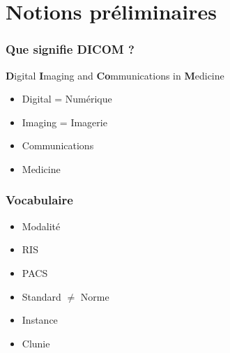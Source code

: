 \section{Notions pr\'eliminaires}

	\frame
	{
		\frametitle{Que signifie DICOM ?}
		
		\textbf{D}igital \textbf{I}maging and \textbf{Co}mmunications in \textbf{M}edicine
		\begin{itemize}
			\item Digital = Num\'erique
		    	\item Imaging = Imagerie
		    	\item Communications
		    	\item Medicine
		\end{itemize}
	}
	
	\frame
	{
		\frametitle{Vocabulaire}
		\begin{itemize}
			\item Modalit\'e
			\item RIS
			\item PACS
			\item Standard $\neq$ Norme
			\item Instance
			\item Clunie
		\end{itemize}
	}
	
